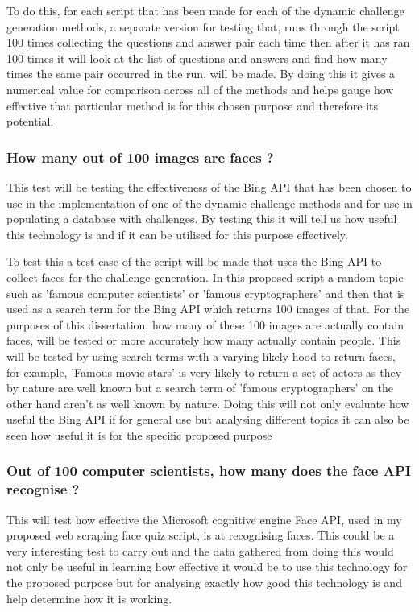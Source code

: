 \documentclass[12pt,a4paper]{article}
\begin{document}
To do this, for each script that has been made for each of the dynamic challenge generation methods, a separate version for testing that, runs through the script 100 times collecting the questions and answer pair each time then after it has ran 100 times it will look at the list of questions and answers and find how many times the same pair occurred in the run, will be made. By doing this it gives a numerical value for comparison across all of the methods and helps gauge how effective that particular method is for this chosen purpose and therefore its potential.  

\subsubsection{How many out of 100 images are faces ?}  
This test will be testing the effectiveness of the Bing API that has been chosen to use in the implementation of one of the dynamic challenge methods and for use in populating a database with challenges. By testing this it will tell us how useful this technology is and if it can be utilised for this purpose effectively. 

To test this a test case of the script will be made that uses the Bing API to collect faces for the challenge generation. In this proposed script a random topic such as 'famous computer scientists' or 'famous cryptographers' and then that is used as a search term for the Bing API which returns 100 images of that. For the purposes of this dissertation, how many of these 100 images are actually contain faces, will be tested or more accurately how many actually contain people. This will be tested by using search terms with a varying likely hood to return faces, for example,  'Famous movie stars' is very likely to return a set of actors as they by nature are well known but a search term of 'famous cryptographers' on the other hand aren't as well known by nature. Doing this will not only evaluate how useful the Bing API if for general use but analysing different topics it can also be seen how useful it is for the specific  proposed purpose 
\subsubsection{Out of 100 computer scientists, how many does the face API recognise ?} 
This will test how effective the Microsoft cognitive engine Face API, used in my proposed web scraping face quiz script, is at recognising faces. This could be a very interesting test to carry out and the data gathered from doing this would not only be useful in learning how effective it would be to use this technology for the proposed purpose but for analysing exactly how good this technology is and help determine how it is working. 
\end{document}

